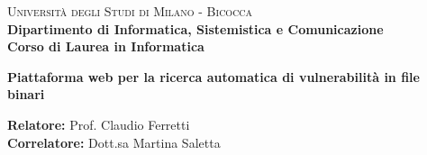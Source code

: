 

    
\begin{titlepage}
    
    \noindent
    \begin{minipage}[t]{0.19\textwidth}
    \end{minipage}
    \hspace{2mm}
    \begin{minipage}[t]{0.70\textwidth}
    {
            {\textsc{Università degli Studi di Milano - Bicocca}} \\
            \textbf{Dipartimento di Informatica, Sistemistica e Comunicazione} \\
            \textbf{Corso di Laurea in Informatica} \\
            \par
    }
    \end{minipage}
    
\vspace{40mm}
    
\begin{center}
        {\LARGE{
                \textbf{ Piattaforma web per la ricerca automatica di vulnerabilità in file binari } }
                \par
        }
    \end{center}
    
    \vspace{50mm}

    \noindent
    {\large \textbf{Relatore:} Prof. Claudio Ferretti } \\

    \noindent
    {\large \textbf{Correlatore:} Dott.sa Martina Saletta }
    
    \vspace{15mm}


\end{titlepage}
